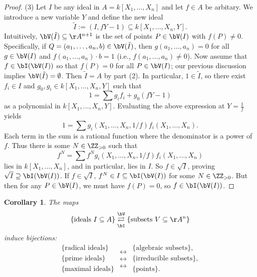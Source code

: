 \documentclass[12pt]{amsart}
\theoremstyle{plain}
\newtheorem{corollary}[theorem]{Corollary}
\begin{document}
\begin{proof}
(3) Let $I$ be any ideal in $A = k[X_1, \ldots, X_n]$ and let $f \in A$ be arbitary.
We introduce a new variable $Y$ and define the new ideal
$$\tilde I := (I, f Y - 1) \subseteq k[X_1, \ldots, X_n, Y].$$
Intuitively, $\bV(\tilde I) \subseteq \AA^{n+1}$ is the set of points $P \in \bV(I)$ with $f(P) \ne 0$.
Specifically, if $Q = (a_1, \ldots, a_n, b) \in \bV(\tilde I)$, then $g(a_1, \ldots, a_n) = 0$ for all $g \in \bV(I)$
and $f(a_1, \ldots, a_n) \cdot b = 1$ (i.e., $f(a_1, \ldots, a_n) \ne 0$).
Now assume that $f \in \bI(\bV(I))$ so that $f(P) = 0$ for all $P \in \bV(I)$;
our previous discussion implies $\bV(\tilde I) = \emptyset$.
Then $\tilde I = A$ by part (2).
In particular, $1 \in \tilde I$, so there exist $f_i \in I$ and $g_0, g_i \in k[X_1, \ldots, X_n, Y]$ such that
$$1 = \sum g_i f_i + g_0 (f Y - 1)$$
as a polynomial in $k[X_1, \ldots, X_n, Y]$.
Evaluating the above expression at $Y = \frac{1}{f}$ yields
$$1 = \sum g_i(X_1, \ldots, X_n, 1/f) f_i(X_1, \ldots, X_n).$$
Each term in the sum is a rational function where the denominator is a power of $f$.
Thus there is some $N \in \ZZ_{> 0 }$ such that 
$$f^N = \sum f^N g_i (X_1, \ldots, X_n, 1/f) f_i(X_1,\ldots,X_n)$$
lies in $k[X_1, \ldots, X_n]$, and in particular, lies in $I$.
So $f \in \sqrt{I}$, proving $\sqrt{I} \supseteq \bI(\bV(I))$.
If $f \in \sqrt{I}$, $f^N \in I \subseteq \bI(\bV(I))$ for some $N \in \ZZ_{> 0}$.
But then for any $P \in \bV(I)$, we must have $f(P) = 0$, so $f \in \bI(\bV(I))$.
\end{proof}

\begin{corollary}\label{nullbijection}
The maps
$$\{\text{ideals } I \subseteq A\} \underset{\bI}{\overset{\bV}{\rightleftarrows}} \{\text{subsets } V \subseteq \AA^n\}$$
induce bijections:
$$
\begin{array}{c}
\{\text{radical ideals}\} \\
\{\text{prime ideals}\} \\
\{\text{maximal ideals}\} 
\end{array}
\begin{array}{c}
\longleftrightarrow \\
\longleftrightarrow \\
\longleftrightarrow  
\end{array}
\begin{array}{c}
\{\text{algebraic subsets}\}, \\
\{\text{irreducible subsets}\}, \\
\{\text{points}\} .
\end{array}
$$
\end{corollary}
\end{document}

